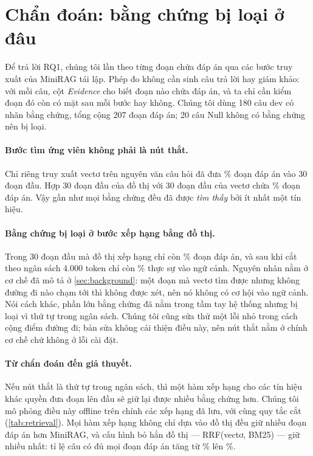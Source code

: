 \section{Chẩn đoán: bằng chứng bị loại ở đâu}\label{sec:diagnosis}

Để trả lời RQ1, chúng tôi lần theo từng đoạn chứa đáp án qua các bước truy xuất của MiniRAG tái lập.
Phép đo không cần sinh câu trả lời hay giám khảo: với mỗi câu, cột \emph{Evidence} cho biết đoạn nào chứa đáp án, và ta chỉ cần kiểm đoạn đó còn có mặt sau mỗi bước hay không.
Chúng tôi dùng 180 câu dev có nhãn bằng chứng, tổng cộng 207 đoạn đáp án; 20 câu Null không có bằng chứng nên bị loại.

\paragraph{Bước tìm ứng viên không phải là nút thắt.}
Chỉ riêng truy xuất vectơ trên nguyên văn câu hỏi đã đưa \retVecTopThirty\% đoạn đáp án vào 30 đoạn đầu.
Hợp 30 đoạn đầu của đồ thị với 30 đoạn đầu của vectơ chứa \unionGV\% đoạn đáp án.
Vậy gần như mọi bằng chứng đều đã được \emph{tìm thấy} bởi ít nhất một tín hiệu.

\paragraph{Bằng chứng bị loại ở bước xếp hạng bằng đồ thị.}
Trong 30 đoạn đầu mà đồ thị xếp hạng chỉ còn \retGraphTopThirty\% đoạn đáp án, và sau khi cắt theo ngân sách 4.000 token chỉ còn \retChunkBase\% thực sự vào ngữ cảnh.
Nguyên nhân nằm ở cơ chế đã mô tả ở \cref{sec:background}: một đoạn mà vectơ tìm được nhưng không đường đi nào chạm tới thì không được xét, nên nó không có cơ hội vào ngữ cảnh.
Nói cách khác, phần lớn bằng chứng đã nằm trong tầm tay hệ thống nhưng bị loại vì thứ tự trong ngân sách.
Chúng tôi cũng sửa thử một lỗi nhỏ trong cách cộng điểm đường đi; bản sửa không cải thiện điều này, nên nút thắt nằm ở chính cơ chế chứ không ở lỗi cài đặt.

\paragraph{Từ chẩn đoán đến giả thuyết.}
Nếu nút thắt là thứ tự trong ngân sách, thì một hàm xếp hạng cho các tín hiệu khác quyền đưa đoạn lên đầu sẽ giữ lại được nhiều bằng chứng hơn.
Chúng tôi mô phỏng điều này offline trên chính các xếp hạng đã lưu, với cùng quy tắc cắt (\cref{tab:retrieval}).
Mọi hàm xếp hạng không chỉ dựa vào đồ thị đều giữ nhiều đoạn đáp án hơn MiniRAG, và cấu hình bỏ hẳn đồ thị --- RRF(vectơ, BM25) --- giữ nhiều nhất: tỉ lệ câu có đủ mọi đoạn đáp án tăng từ \retFullBase\% lên \retFullVK\%.

